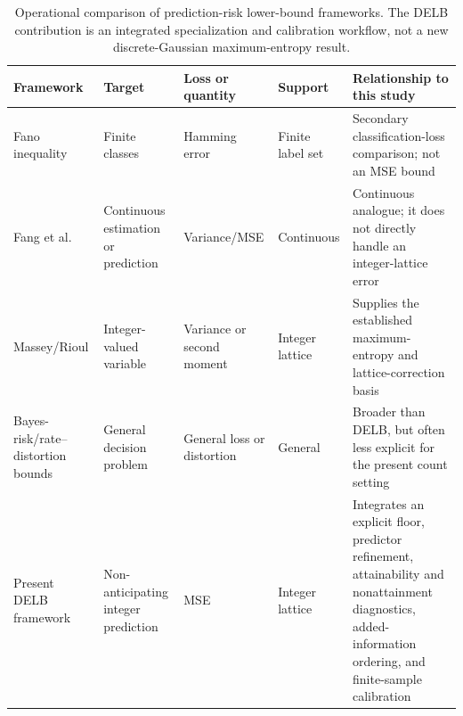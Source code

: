 \begin{table}[H]
\caption{Operational comparison of prediction-risk lower-bound frameworks.
The DELB contribution is an integrated specialization and calibration
workflow, not a new discrete-Gaussian maximum-entropy result.}
\label{tab:core_bound_comparison}
\centering
\scriptsize
\setlength{\tabcolsep}{2.5pt}
\begin{tabularx}{\textwidth}{
    >{\RaggedRight\arraybackslash}p{}
    >{\RaggedRight\arraybackslash}p{}
    >{\RaggedRight\arraybackslash}p{}
    >{\RaggedRight\arraybackslash}p{}
    >{\RaggedRight\arraybackslash}X}
\toprule
\textbf{Framework} & \textbf{Target} & \textbf{Loss or quantity} &
\textbf{Support} & \textbf{Relationship to this study}\\
\midrule
Fano inequality \citep{cover_thomas,feder_merhav}
& Finite classes & Hamming error & Finite label set
& Secondary classification-loss comparison; not an MSE bound\\

Fang et al.\ \citep{fang_variance_bounds}
& Continuous estimation or prediction & Variance/MSE & Continuous
& Continuous analogue; it does not directly handle an integer-lattice
error\\

Massey/Rioul \citep{massey_integer_entropy,rioul_massey}
& Integer-valued variable & Variance or second moment & Integer lattice
& Supplies the established maximum-entropy and lattice-correction basis\\

Bayes-risk/rate--distortion bounds
\citep{shannon_rate_distortion,chen_bayes_risk}
& General decision problem & General loss or distortion & General
& Broader than DELB, but often less explicit for the present count setting\\

Present DELB framework
& Non-anticipating integer prediction & MSE & Integer lattice
& Integrates an explicit floor, predictor refinement, attainability and
nonattainment diagnostics, added-information ordering, and finite-sample
calibration\\
\bottomrule
\end{tabularx}
\end{table}
